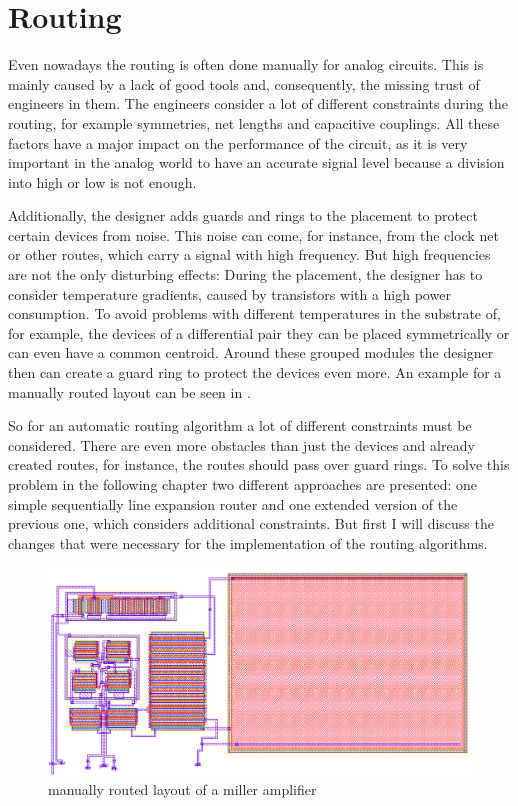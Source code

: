 \chapter{Routing}

Even nowadays the routing is often done manually for analog circuits. This is mainly caused by a lack of good tools and, consequently, the missing trust of engineers in them. The engineers consider a lot of different constraints during the routing, for example symmetries, net lengths and capacitive couplings. All these factors have a major impact on the performance of the circuit, as it is very important in the analog world to have an accurate signal level because a division into high or low is not enough.

Additionally, the designer adds guards and rings to the placement to protect certain devices from noise. This noise can come, for instance, from the clock net or other routes, which carry a signal with high frequency. But high frequencies are not the only disturbing effects: During the placement, the designer has to consider temperature gradients, caused by transistors with a high power consumption. To avoid problems with different temperatures in the substrate of, for example, the devices of a differential pair they can be placed symmetrically or can even have a common centroid. Around these grouped modules the designer then can create a guard ring to protect the devices even more. An example for a manually routed layout can be seen in .

So for an automatic routing algorithm a lot of different constraints must be considered. There are even more obstacles than just the devices and already created routes, for instance, the routes should pass over guard rings. To solve this problem in the following chapter two different approaches are presented: one simple sequentially line expansion router and one extended version of the previous one, which considers additional constraints. But first I will discuss the changes that were necessary for the implementation of the routing algorithms.

\begin{figure}
	\centering
	\includegraphics[scale=.4]{FIG/miller_amplifier_layout_routed.png}
  	\caption{manually routed layout of a miller amplifier}
	\label{fig:miller_amplifier_routed_layout}
\end{figure}

